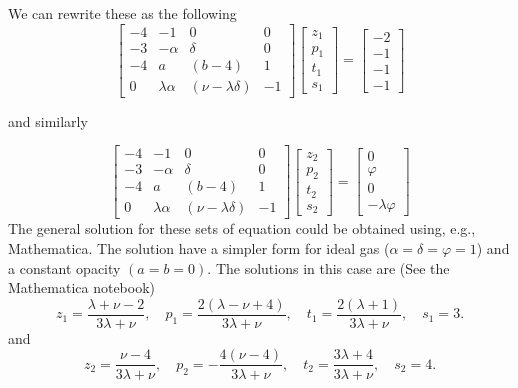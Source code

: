 \documentclass{revtex4-2}
\begin{document}
We can rewrite these as the following
\begin{equation}
  \label{eq:matrix-1}
  \begin{bmatrix}
    -4 & -1 & 0 & 0\\
    -3 & -\alpha & \delta & 0\\
    -4 & a & (b-4) & 1\\
    0 & \lambda\alpha & (\nu-\lambda\delta) & -1
  \end{bmatrix}
  \begin{bmatrix}
    z_1 \\
    p_1 \\
    t_1\\
    s_1
  \end{bmatrix} =
  \begin{bmatrix}
    -2\\
    -1\\
    -1\\
    -1
  \end{bmatrix}
\end{equation}

and similarly

\begin{equation}
  \label{eq:matrix-2}
  \begin{bmatrix}
    -4 & -1 & 0 & 0\\
    -3 & -\alpha & \delta & 0\\
    -4 & a & (b-4) & 1\\
    0 & \lambda\alpha & (\nu-\lambda\delta) & -1
  \end{bmatrix}
  \begin{bmatrix}
    z_2 \\
    p_2 \\
    t_2\\
    s_2
  \end{bmatrix} =
  \begin{bmatrix}
    0\\
    \varphi\\
    0\\
    -\lambda\varphi
  \end{bmatrix}
\end{equation}
The general solution for these sets of equation could be obtained using, e.g., Mathematica. The solution have a simpler form for ideal gas ($\alpha = \delta = \varphi = 1$) and a constant opacity $(a=b=0)$. The solutions in this case are (See the Mathematica notebook)
\begin{equation}
  \label{eq:sol-1}
  z_1 = \frac{\lambda +\nu -2}{3 \lambda +\nu },\quad p_1 = \frac{2 (\lambda -\nu +4)}{3 \lambda +\nu },\quad t_1 = \frac{2 (\lambda +1)}{3 \lambda +\nu },\quad s_1 = 3.
\end{equation}
and
\begin{equation}
  \label{eq:sol-2}
  z_2 = \frac{\nu -4}{3 \lambda +\nu },\quad p_2 =  -\frac{4 (\nu -4)}{3 \lambda +\nu },\quad t_2 = \frac{3 \lambda +4}{3 \lambda +\nu },\quad s_2 = 4.
\end{equation}
\end{document}
